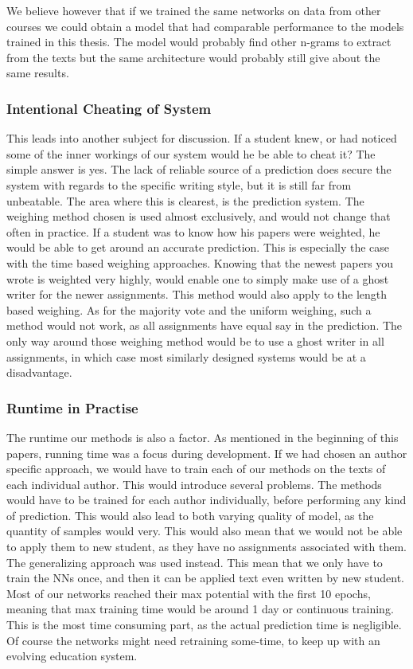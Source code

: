 We believe however that if we trained the same networks on data from other
courses we could obtain a model that had comparable performance to the models
trained in this thesis. The model would probably find other n-grams to extract
from the texts but the same architecture would probably still give about the
same results.


\subsubsection{Intentional Cheating of System}

This leads into another subject for discussion. If a student knew, or had
noticed some of the inner workings of our system would he be able to cheat it?
The simple answer is yes. The lack of reliable source of a prediction does
secure the system with regards to the specific writing style, but it is still
far from unbeatable. The area where this is clearest, is the prediction system.
The weighing method chosen is used almost exclusively, and would not change
that often in practice. If a student was to know how his papers were weighted,
he would be able to get around an accurate prediction. This is especially the
case with the time based weighing approaches. Knowing that the newest papers
you wrote is weighted very highly, would enable one to simply make use of a
ghost writer for the newer assignments. This method would also apply to the
length based weighing. As for the majority vote and the uniform weighing, such
a method would not work, as all assignments have equal say in the prediction.
The only way around those weighing method would be to use a ghost writer in
all assignments, in which case most similarly designed systems would be at a
disadvantage.


\subsubsection{Runtime in Practise}

The runtime our methods is also a factor. As mentioned in the beginning of this
papers, running time was a focus during development. If we had chosen an author
specific approach, we would have to train each of our methods on the texts of
each individual author. This would introduce several problems. The methods
would have to be trained for each author individually, before performing any
kind of prediction. This would also lead to both varying quality of model, as
the quantity of samples would very. This would also mean that we would not be
able to apply them to new student, as they have no assignments associated with
them. The generalizing approach was used instead. This mean that we only have
to train the \glspl{NN} once, and then it can be applied text even written by
new student. Most of our networks reached their max potential with the first
10 epochs, meaning that max training time would be around 1 day or continuous
training. This is the most time consuming part, as the actual prediction time is
negligible. Of course the networks might need retraining some-time, to keep up
with an evolving education system.


